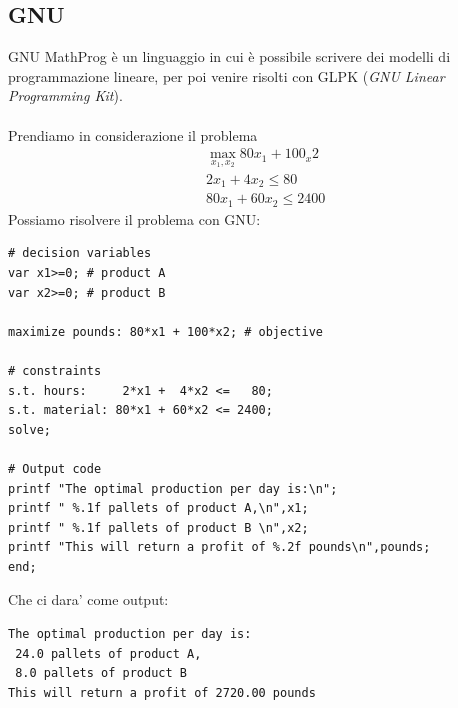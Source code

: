 \documentclass[a4paper,12pt]{article}
\begin{document}
\subsection{GNU}
GNU MathProg è un linguaggio in cui è possibile scrivere dei modelli di programmazione lineare, per poi venire risolti con GLPK (\textit{GNU Linear Programming Kit}).\\
\vspace{1px}\\
Prendiamo in considerazione il problema
\begin{align*}
  & \max_{x_1, x_2} 80x_1+100_x2 \\
  & 2x_1 + 4x_2 \leq 80\\
  & 80x_1 + 60x_2 \leq 2400
\end{align*}
Possiamo risolvere il problema con GNU:
\begin{lstlisting}
# decision variables
var x1>=0; # product A
var x2>=0; # product B

maximize pounds: 80*x1 + 100*x2; # objective

# constraints
s.t. hours:     2*x1 +  4*x2 <=   80;
s.t. material: 80*x1 + 60*x2 <= 2400;
solve;

# Output code
printf "The optimal production per day is:\n";
printf " %.1f pallets of product A,\n",x1; 
printf " %.1f pallets of product B \n",x2; 
printf "This will return a profit of %.2f pounds\n",pounds;
end;
\end{lstlisting}
Che ci dara' come output:
\begin{lstlisting}
The optimal production per day is:
 24.0 pallets of product A,
 8.0 pallets of product B
This will return a profit of 2720.00 pounds
\end{lstlisting}
\end{document}
